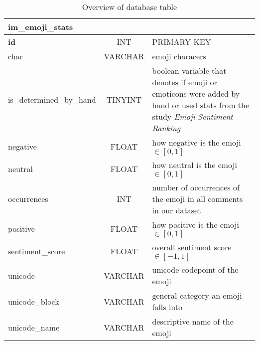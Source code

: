 \begin{table}[H]
\centering
\onehalfspacing

\begin{tabularx}{0.95\textwidth}{ l || c | X }
	\hline
	\multicolumn{3}{l}{ \textbf{im\_emoji\_stats} } \\
	\hline
 	\textbf{id} & INT & PRIMARY KEY \\  
	char & VARCHAR &  emoji  characers \\ 
	is\_determined\_by\_hand & TINYINT & boolean variable that denotes if emoji or emoticons were added by hand or used stats from the study \emph{Emoji Sentiment Ranking} \\ 
	negative & FLOAT &  how negative is the emoji $\in [0,1]$ \\ 
	neutral & FLOAT &  how neutral is the emoji $\in [0,1]$ \\ 
	occurrences & INT & number of occurrences of the emoji in all comments in our dataset \\ 
	positive & FLOAT & how positive is the emoji $\in [0,1]$ \\ 
	sentiment\_score & FLOAT & overall sentiment score $\in [-1,1]$ \\ 
	unicode & VARCHAR & unicode codepoint of the emoji \\ 
	unicode\_block & VARCHAR & general category an emoji falls into \\ 
	unicode\_name & VARCHAR & descriptive name of the emoji \\ 
	\hline
\end{tabularx}

\caption{Overview of  database table}
\label{tab:im-emoji-stats}

\end{table}